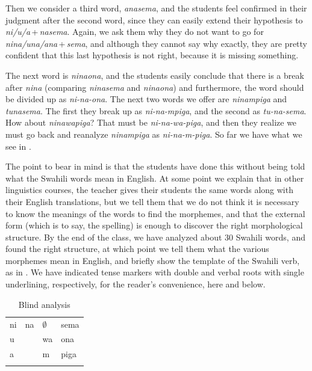 \documentclass[output=paper,colorlinks,citecolor=brown]{langscibook}
\begin{document}
Then we consider a third word, \textit{anasema}, and the students feel confirmed in their judgment after the second word, since they can easily extend their hypothesis to \textit{ni/u/a}\,+\,\textit{nasema}. Again, we ask them why they do not want to go for \textit{nina/una/ana}\,+\,\textit{sema}, and although they cannot say why exactly, they are pretty confident that this last hypothesis is not right, because it is missing something. 

The next word is \textit{ninaona}, and the students easily conclude that there is a break after \textit{nina} (comparing \textit{ninasema} and \textit{ninaona}) and furthermore, the word should be divided up as \textit{ni-na-ona}. The next two words we offer are \textit{ninampiga} and \textit{tunasema}. The first they break up as \textit{ni-na-mpiga}, and the second as \textit{tu-na-sema}. How about \textit{ninawapiga}? That must be \textit{ni-na-wa-piga}, and then they realize we must go back and reanalyze \textit{ninampiga} as \textit{ni-na-m-piga}. So far we have what we see in .

The point to bear in mind is that the students have done this without being told what the Swahili words mean in English. At some point we explain that in other linguistics courses, the teacher gives their students the same words along with their English translations, but we tell them that we do not think it is necessary to know the meanings of the words to find the morphemes, and that the external form (which is to say, the spelling) is enough to discover the right morphological structure. By the end of the class, we have analyzed about 30 Swahili words, and found the right structure, at which point we tell them what the various morphemes mean in English, and briefly show the template of the Swahili verb, as in . We have indicated tense markers with double and verbal roots with single underlining, respectively, for the reader's convenience, here and below. 



\begin{table}
\begin{tabular}{llll} \lsptoprule
ni & na & $\emptyset$ & sema \\
u &     & wa & ona \\
a &     & m  & piga \\ \lspbottomrule
\end{tabular}
\caption{Blind analysis}
\label{blind-analysis}
\end{table}
\end{document}
